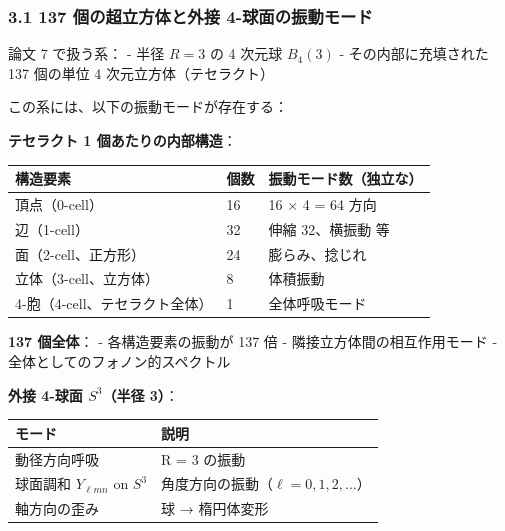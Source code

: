 \documentclass[
  11pt]{ltjsarticle}
\newcounter{none} %
\begin{document}
\subsubsection{3.1 137 個の超立方体と外接
4-球面の振動モード}\label{ux500bux306eux8d85ux7acbux65b9ux4f53ux3068ux5916ux63a5-4-ux7403ux9762ux306eux632fux52d5ux30e2ux30fcux30c9}

論文 7 で扱う系： - 半径 \(R = 3\) の 4 次元球 \(B_4(3)\) -
その内部に充填された 137 個の単位 4 次元立方体（テセラクト）

この系には、以下の振動モードが存在する：

\textbf{テセラクト 1 個あたりの内部構造}：

{\def\LTcaptype{none} %
\begin{longtable}[]{@{}lll@{}}
\toprule\noalign{}
構造要素 & 個数 & 振動モード数（独立な） \\
\midrule\noalign{}
\endhead
\bottomrule\noalign{}
\endlastfoot
頂点（0-cell） & 16 & 16 × 4 = 64 方向 \\
辺（1-cell） & 32 & 伸縮 32、横振動 等 \\
面（2-cell、正方形） & 24 & 膨らみ、捻じれ \\
立体（3-cell、立方体） & 8 & 体積振動 \\
4-胞（4-cell、テセラクト全体） & 1 & 全体呼吸モード \\
\end{longtable}
}

\textbf{137 個全体}： - 各構造要素の振動が 137 倍 -
隣接立方体間の相互作用モード - 全体としてのフォノン的スペクトル

\textbf{外接 4-球面 \(S^3\)（半径 3）}：

{\def\LTcaptype{none} %
\begin{longtable}[]{@{}
  >{\raggedright\arraybackslash}p{}
  >{\raggedright\arraybackslash}p{}@{}}
\toprule\noalign{}
\begin{minipage}[b]{\linewidth}\raggedright
モード
\end{minipage} & \begin{minipage}[b]{\linewidth}\raggedright
説明
\end{minipage} \\
\midrule\noalign{}
\endhead
\bottomrule\noalign{}
\endlastfoot
動径方向呼吸 & R = 3 の振動 \\
球面調和 \(Y_{\ell m n}\) on \(S^3\) &
角度方向の振動（\(\ell = 0, 1, 2, \ldots\)） \\
4 軸方向の歪み & 球 → 楕円体変形 \\
\end{longtable}
}
\end{document}
